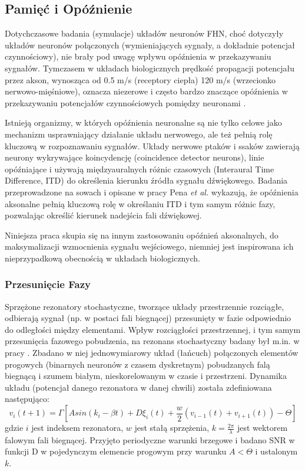   \subsection{Pamięć i Opóźnienie}
  
  Dotychczasowe badania (symulacje) układów neuronów FHN, choć dotyczyły układów neuronów połączonych (wymieniających sygnały, a dokładnie potencjał czynnościowy), nie brały pod uwagę wpływu opóźnienia w przekazywaniu sygnałów. Tymczasem w układach biologicznych prędkość propagacji potencjału przez akson, wynosząca od 0.5 m/s (receptory ciepła) 120 m/s (wrzecionko nerwowo-mięśniowe), oznacza niezerowe i często bardzo znaczące opóźnienia w przekazywaniu potencjałów czynnościowych pomiędzy neuronami \cite{kandel}.

  Istnieją organizmy, w których opóźnienia neuronalne są nie tylko celowe jako mechanizm usprawniający działanie układu nerwowego, ale też pełnią rolę kluczową w rozpoznawaniu sygnałów. Układy nerwowe ptaków i ssaków zawierają neurony wykrywające koincydencję (coincidence detector neurons), linie opóźniające i używają międzyauralnych różnic czasowych (Interaural Time Difference, ITD) do określenia kierunku źródła sygnału dźwiękowego. Badania przeprowadzone na sowach i opisane w pracy Pena \emph{et al.} \cite{pena} wykazują, że opóźnienia aksonalne pełnią kluczową rolę w określaniu ITD i tym samym różnic fazy, pozwalając określić kierunek nadejścia fali dźwiękowej.

  Niniejsza praca skupia się na innym zastosowaniu opóźnień aksonalnych, do maksymalizacji wzmocnienia sygnału wejściowego, niemniej jest inspirowana ich nieprzypadkową obecnością w układach biologicznych.
  

  \subsubsection{Przesunięcie Fazy}
  \label{sec:przesuniecie_fazy}

  Sprzężone rezonatory stochastyczne, tworzące układy przestrzennie rozciągłe, odbierają sygnał (np. w postaci fali biegnącej) przesunięty w fazie odpowiednio do odległości między elementami. Wpływ rozciągłości przestrzennej, i tym samym przesunięcia fazowego pobudzenia, na rezonans stochastyczny badany był m.in. w pracy \cite{ijmpb_14_8}. Zbadano w niej jednowymiarowy układ (łańcuch) połączonych elementów progowych (binarnych neuronów z czasem dyskretnym) pobudzanych falą biegnącą i szumem białym, nieskorelowanym w czasie i przestrzeni. Dynamika układu (potencjał danego rezonatora w danej chwili) została zdefiniowana następująco:
  \begin{equation} \label{sr:jezo:1}
    v_i (t+1) = \Gamma [A sin (k_i - \beta t) + D \xi_i (t) + \frac{w}{2}(v_{i-1}(t) + v_{i+1}(t)) - \Theta]
  \end{equation}
  gdzie $i$ jest indeksem rezonatora, $w$ jest stałą sprzężenia, $k = \frac{2 \pi}{\lambda}$ jest wektorem falowym fali biegnącej. Przyjęto periodyczne warunki brzegowe i badano SNR w funkcji D w pojedynczym elemencie progowym przy warunku $A < \Theta$ i ustalonym $k$.


